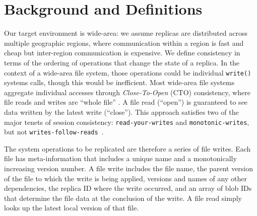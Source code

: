 \documentclass[10pt,conference,letterpaper]{IEEEtran}
\newcommand{\todo}[1]{{\textcolor{red}{#1}}}
\newcommand{\pjk}[1]{[\todo{PJK: #1}]}
\begin{document}
\section{Background and Definitions}
\label{sec:background}

Our target environment is wide-area: we assume
replicas are distributed across
multiple geographic regions, where communication within a region is fast and
cheap but inter-region communication is expensive.
We define consistency in terms of the ordering of operations that change the
state of a replica.
In the context of a wide-area file system, those operations could be individual
\texttt{write()} systems calls, though this would be inefficient.
Most wide-area file systems aggregate individual accesses through
\textit{Close-To-Open} (CTO) consistency, where file reads and writes are
``whole file'' \cite{afs,coda,lbfs}.
A file read (``open'') is guaranteed to see data written by the latest write
(``close'').
This approach satisfies two of the major tenets of session consistency:
\texttt{read-your-writes} and
\texttt{monotonic-writes}, but not
\texttt{writes-follow-reads}~\cite{bermbach_consistency_2013,terry_session_1994,vogels_eventually_2009}.

The system operations to be replicated are therefore a series of file writes.
Each file has meta-information that includes a unique name and a monotonically
increasing version number.
A file write includes the file name, the parent version of the file to which the write is being applied,
versions and names of any other dependencies, the replica ID where the write
occurred, and an array of blob IDs that determine the file data at
the conclusion of the write.
A file read simply looks up the latest local version of that file.

\end{document}
